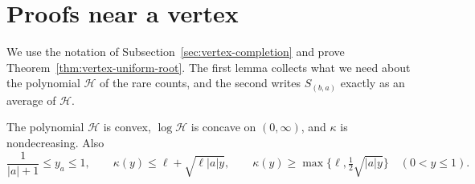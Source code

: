 \section{Proofs near a vertex}
\label{app:vertex}

We use the notation of Subsection~\ref{sec:vertex-completion} and prove
Theorem~\ref{thm:vertex-uniform-root}. The first lemma collects what we need
about the polynomial $\mathcal H$ of the rare counts, and the second writes $S_{(b,a)}$
exactly as an average of $\mathcal H$.

\begin{lemma}
\label{lem:vertex-elasticity}
The polynomial $\mathcal H$ is convex, $\log\mathcal H$ is concave on $(0,\infty)$,
and $\kappa$ is nondecreasing. Also
\begin{equation}\label{eq:vertex-elasticity}
 \frac1{|a|+1}\le y_a\le1,\qquad
 \kappa(y)\le \ell+\sqrt{\ell|a|y},
 \qquad \kappa(y)\ge \max\{\ell,\tfrac12\sqrt{|a|y}\}
 \quad(0<y\le1).
\end{equation}
\end{lemma}

